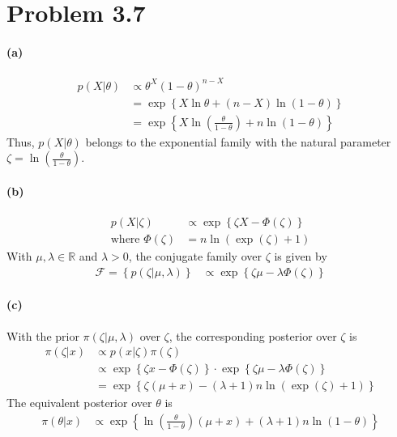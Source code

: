 \section{Problem 3.7}
\paragraph{(a)}
\begin{align*}
    p(X \vert \theta) 
    &\propto \theta^X (1-\theta)^{n-X}\\
    &= \exp \left\{ X\ln \theta + (n-X) \ln (1-\theta)
        \right\}\\
    &= \exp \left\{ X\ln \left( \frac{\theta}{1-\theta} \right) + n\ln(1-\theta)
        \right\}
\end{align*}
Thus, $p(X \vert \theta)$ belongs to the exponential family with the natural parameter $\zeta = \ln \left( \frac{\theta}{1-\theta}\right)$.

\paragraph{(b)}
\begin{align*}
    p(X \vert \zeta)
    &\propto \exp \left\{ \zeta X - \Phi(\zeta)
        \right\}\\
    \text{where } \Phi(\zeta)
    &= n \ln (\exp(\zeta) + 1)
\end{align*}
With $\mu, \lambda \in \mathbb{R}$ and $\lambda > 0$, the conjugate family over $\zeta$ is given by
\begin{align*}
    \mathcal{F} = \left\{ p(\zeta \vert \mu, \lambda )\right\}
    &\propto \exp \left\{ \zeta \mu - \lambda \Phi(\zeta)
        \right\}
\end{align*}

\paragraph{(c)}
With the prior $\pi(\zeta \vert \mu, \lambda)$ over $\zeta$, the corresponding posterior over $\zeta$ is
\begin{align*}
    \pi(\zeta \vert x)
    &\propto p(x \vert \zeta) \pi(\zeta)\\
    &\propto \exp \left\{ \zeta x - \Phi(\zeta) \right\} \cdot \exp \left\{ \zeta \mu - \lambda \Phi(\zeta) \right\} \\
    &= \exp \left\{ \zeta (\mu+x) - (\lambda+1) n \ln (\exp(\zeta) + 1) \right\}
\end{align*}
The equivalent posterior over $\theta$ is 
\begin{align*}
    \pi(\theta \vert x)
    &\propto \exp \left\{ \ln \left(\frac{\theta}{1-\theta}\right) (\mu+x) + (\lambda+1) n \ln (1-\theta) \right\}
\end{align*}

